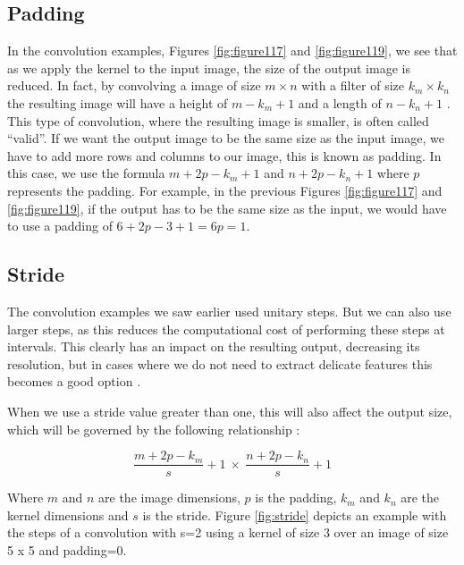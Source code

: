 \subsection{Padding}

In the convolution examples, Figures \ref{fig:figure117} and \ref{fig:figure119}, we see that as we apply the kernel to the input image, the size of the output image is reduced. In fact, by convolving a image of size $m \times n$ with a filter of size $k_m \times k_n$ the resulting image will have a height of $m-k_m+1$ and a length of $n-k_n+1$ . This type of convolution, where the resulting image is smaller, is often called “valid”.
If we want the output image to be the same size as the input image, we have to add more rows and columns to our image, this is known as padding. In this case, we use the formula  $m+2p-k_m+1$ and $n+2p-k_n+1$ where $p$ represents the padding. For example, in the previous Figures \ref{fig:figure117} and \ref{fig:figure119}, if the output has to be the same size as the input, we would have to use a padding of $6+2p-3+1=6p=1$.

\subsection{Stride}

The convolution examples we saw earlier used unitary steps. But we can also use larger steps, as this reduces the computational cost of performing these steps at intervals. This clearly has an impact on the resulting output, decreasing its resolution, but in cases where we do not need to extract delicate features this becomes a good option \cite{goodfellow2016}.

When we use a stride value greater than one, this will also affect the output size, which will be governed by the following relationship \cite{adrian2017}:

\begin{equation}
\frac{m+2p-k_m}{s}+1 \  \times \ \frac{n+2p-k_n}{s}+1
\end{equation}

Where $m$ and $n$ are the image dimensions, $p$ is the padding, $k_m$ and $k_n$ are the kernel dimensions and $s$ is the stride. Figure \ref{fig:stride} depicts an example with the steps of a convolution with s=2 using a kernel of size 3 over an image of size 5 x 5 and padding=0.

